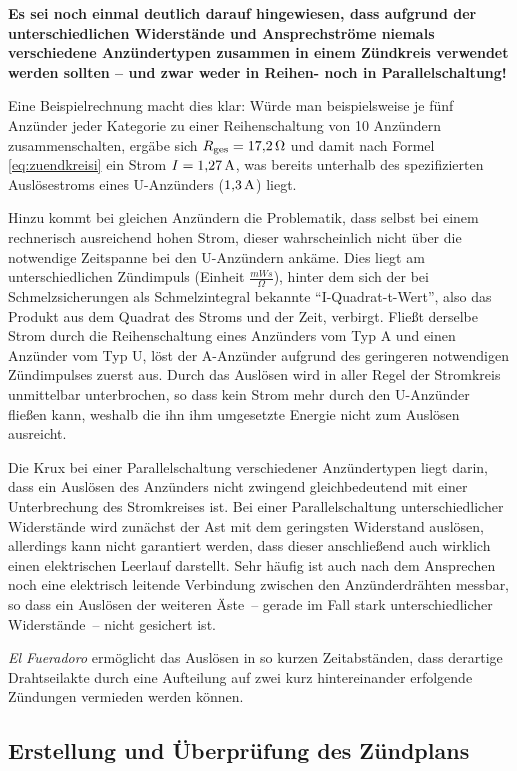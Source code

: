 \documentclass[pdftex, parskip, numbers=noenddot, toc=listof]{scrbook}
\newcommand{\anlage}{\emph{El Fueradoro}}
\begin{document}
				\textbf{Es sei noch einmal deutlich darauf hingewiesen, dass aufgrund der unterschiedlichen Widerstände und Ansprechströme niemals verschiedene Anzündertypen zusammen in einem Zündkreis verwendet werden sollten -- und zwar weder in Reihen- noch in Parallelschaltung!}

				Eine Beispielrechnung macht dies klar: Würde man beispielsweise je fünf Anzünder jeder Kategorie zu einer Reihenschaltung von 10 Anzündern zusammenschalten, ergäbe sich $R_\text{ges} = \unit[17{,}2]{\Omega}$ und damit nach Formel \eqref{eq:zuendkreisi} ein Strom $I = \unit[1{,}27]{A}$, was bereits unterhalb des spezifizierten Auslösestroms eines U-Anzünders ($\unit[1{,}3]{A}$) liegt.

				Hinzu kommt bei gleichen Anzündern die Problematik, dass selbst bei einem rechnerisch ausreichend hohen Strom, dieser wahrscheinlich nicht über die notwendige Zeitspanne bei den U-Anzündern ankäme. Dies liegt am unterschiedlichen Zündimpuls (Einheit $\unit{\frac{mWs}{\Omega}}$), hinter dem sich der bei Schmelzsicherungen als Schmelzintegral bekannte \enquote{I-Quadrat-t-Wert}, also das Produkt aus dem Quadrat des Stroms und der Zeit, verbirgt. Fließt derselbe Strom durch die Reihenschaltung eines Anzünders vom Typ A und einen Anzünder vom Typ U, löst der A-Anzünder aufgrund des geringeren notwendigen Zündimpulses zuerst aus. Durch das Auslösen wird in aller Regel der Stromkreis unmittelbar unterbrochen, so dass kein Strom mehr durch den U-Anzünder fließen kann, weshalb die ihn ihm umgesetzte Energie nicht zum Auslösen ausreicht.

				Die Krux bei einer Parallelschaltung verschiedener Anzündertypen liegt darin, dass ein Auslösen des Anzünders nicht zwingend gleichbedeutend mit einer Unterbrechung des Stromkreises ist. Bei einer Parallelschaltung unterschiedlicher Widerstände wird zunächst der Ast mit dem geringsten Widerstand auslösen, allerdings kann nicht garantiert werden, dass dieser anschließend auch wirklich einen elektrischen Leerlauf darstellt. Sehr häufig ist auch nach dem Ansprechen noch eine elektrisch leitende Verbindung zwischen den Anzünderdrähten messbar, so dass ein Auslösen der weiteren Äste~-- gerade im Fall stark unterschiedlicher Widerstände~-- nicht gesichert ist.

				{\anlage} ermöglicht das Auslösen in so kurzen Zeitabständen, dass derartige Drahtseilakte durch eine Aufteilung auf zwei kurz hintereinander erfolgende Zündungen vermieden werden können.


			\subsection{Erstellung und Überprüfung des Zündplans}
\end{document}
